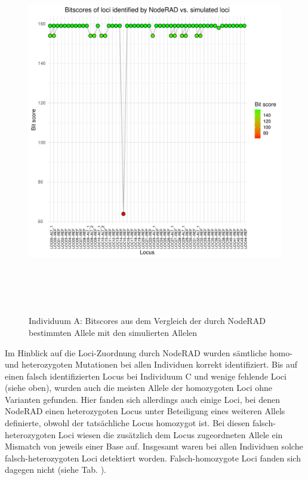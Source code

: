 \begin{figure}[H]
	\begin{center}
		\includegraphics[height=16cm]{bilder/evaluation/bitscores/A.plot_bitscores.pdf}
		\caption{Individuum A: Bitscores aus dem Vergleich der durch NodeRAD bestimmten Allele mit den simulierten Allelen}
		\label{fig:a-bitscore}
	\end{center}
\end{figure}

Im Hinblick auf die Loci-Zuordnung durch NodeRAD wurden sämtliche homo- und heterozygoten Mutationen bei allen Individuen korrekt identifiziert. Bis auf einen falsch identifizierten Locus bei Individuum C und wenige fehlende Loci (siehe oben), wurden auch die meisten Allele der homozygoten Loci ohne Varianten gefunden. Hier fanden sich allerdings auch einige Loci, bei denen NodeRAD einen heterozygoten Locus unter Beteiligung eines weiteren Allels definierte, obwohl der tatsächliche Locus homozygot ist. Bei diesen falsch-heterozygoten Loci wiesen die zusätzlich dem Locus zugeordneten Allele ein Mismatch von jeweils einer Base auf. Insgesamt waren bei allen Individuen solche falsch-heterozygoten Loci detektiert worden. Falsch-homozygote Loci fanden sich dagegen nicht (siehe Tab. ).



\let\cleardoublepage\clearpage